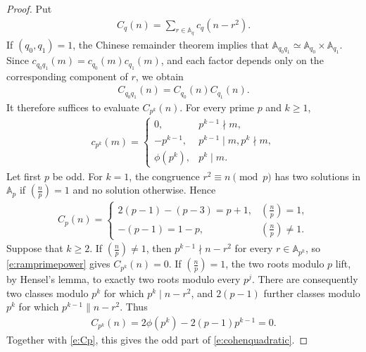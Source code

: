 \documentclass[12pt,reqno]{amsart}
\numberwithin{equation}{section}
\theoremstyle{definition}
\theoremstyle{remark}
\begin{document}
\begin{proof}
Put
\begin{align*}
 C_q(n)=\sum_{r\in\mathbb A_q}c_q(n-r^2).
\end{align*}
If $(q_0,q_1)=1$, the Chinese remainder theorem implies that
$\mathbb A_{q_0q_1} \simeq \mathbb A_{q_0}\times\mathbb A_{q_1}$.
Since $c_{q_0q_1}(m)=c_{q_0}(m)c_{q_1}(m)$, and each factor depends only
on the corresponding component of $r$, we obtain
\begin{align}\label{e:Cmultiplicative}
 C_{q_0q_1}(n)=C_{q_0}(n)C_{q_1}(n).
\end{align}
It therefore suffices to evaluate $C_{p^k}(n)$.
For every prime $p$ and $k\geq1$,
\begin{align}\label{e:ramprimepower}
 c_{p^k}(m)=
 \begin{cases}
  0,&p^{k-1}\nmid m,\\
  -p^{k-1},&p^{k-1}\mid m, p^k\nmid m,\\
  \phi(p^k),&p^k\mid m.
 \end{cases}
\end{align}
Let first $p$ be odd.  For $k=1$, the congruence
$r^2\equiv n\pmod p$ has two solutions in $\mathbb A_p$ if
$(\frac np)=1$ and no solution otherwise.  Hence
\begin{align}\label{e:Cp}
 C_p(n)=
 \begin{cases}
 2(p-1)-(p-3)=p+1,&(\frac np)=1,\\
 -(p-1)=1-p,&(\frac np)\ne1.
 \end{cases}
\end{align}
Suppose that $k\geq2$.  If $(\frac np)\ne1$, then
$p^{k-1}\nmid n-r^2$ for every $r\in\mathbb A_{p^k}$, so
\eqref{e:ramprimepower} gives $C_{p^k}(n)=0$.  If
$(\frac np)=1$, the two roots modulo $p$ lift, by Hensel's lemma, to
exactly two roots modulo every $p^j$.  There are consequently two
classes modulo $p^k$ for which $p^k\mid n-r^2$, and
$2(p-1)$ further classes modulo $p^k$ for which
$p^{k-1}\parallel n-r^2$.  Thus
\begin{align*}
 C_{p^k}(n)=2\phi(p^k)-2(p-1)p^{k-1}=0.
\end{align*}
Together with \eqref{e:Cp}, this gives the odd part of
\eqref{e:cohenquadratic}.


\end{proof}
\end{document}
